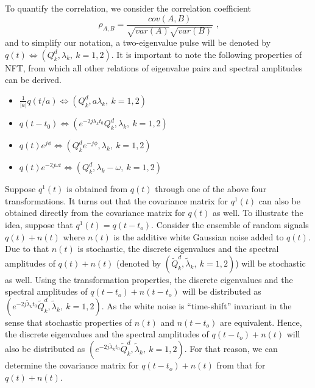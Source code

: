 \documentclass[9pt,twocolumn,twoside]{osajnl}
\begin{document}
To quantify the correlation, we consider the correlation coefficient 
\begin{equation}
    \rho_{A,B} = \frac{cov(A,B)}{\sqrt{var(A)}\sqrt{var(B)}}\text{ ,}
    \label{eq:DefCorrCoeff} 
\end{equation}
and to simplify our notation, a two-eigenvalue pulse will be denoted by $q(t) \Leftrightarrow (Q_k^d, \lambda_k, \: k=1,2)$. It is important to note the following properties of NFT, from which all other relations of eigenvalue pairs and spectral amplitudes can be derived.
\begin{itemize}[topsep=0pt,itemsep=0pt,partopsep=0pt,parsep=0pt]
    \label{lst:rules}
    \item[\ding{192}] $\frac{1}{|a|}q(t/a) \Leftrightarrow (Q^d_k,a\lambda_k,\:k=1,2)$
    \item[\ding{193}] $q(t-t_0) \Leftrightarrow (e^{-2j\lambda_k t_0}Q^d_k,\lambda_k,\:k=1,2)$
    \item[\ding{194}] $q(t)e^{j\phi} \Leftrightarrow (Q^d_k e^{-j\phi},\lambda_k,\:k=1,2)$
    \item[\ding{195}] $q(t)e^{-2j\omega t} \Leftrightarrow (Q^d_k,\lambda_k-\omega,\:k=1,2)$
\end{itemize}

Suppose $q^1(t)$ is obtained from $q(t)$ through one of the above four transformations. It turns out that the covariance matrix for $q^1(t)$ can also be obtained directly from the covariance matrix for $q(t)$ as well. To illustrate the idea, suppose that $q^1(t)=q(t-t_o)$. Consider the ensemble of random signals $q(t) + n(t)$ where $n(t)$ is the additive white Gaussian noise added to $q(t)$. Due to that $n(t)$ is stochastic, the discrete eigenvalues and the spectral amplitudes of $q(t)+n(t)$ (denoted by  $(\widetilde{Q}_k^d,\widetilde{\lambda}_k,\:k=1,2)$) will be stochastic as well. Using the transformation properties, the discrete eigenvalues and the spectral amplitudes of $q(t-t_o) + n(t-t_o)$ will be distributed as $(e^{-2j\widetilde{\lambda}_k t_0}\widetilde{Q}_k^d,\widetilde{\lambda}_k,\:k=1,2)$. As the white noise is ``time-shift'' invariant in the sense that stochastic properties of $n(t)$ and $n(t-t_o)$ are equivalent. Hence, the discrete eigenvalues and the spectral amplitudes of $q(t-t_o)+n(t)$ will also be distributed as $(e^{-2j\widetilde{\lambda}_k t_0}\widetilde{Q}_k^d,\widetilde{\lambda}_k,\:k=1,2)$. For that reason, we can determine the covariance matrix for $q(t-t_o)+n(t)$ from that for $q(t)+n(t)$.
\end{document}
